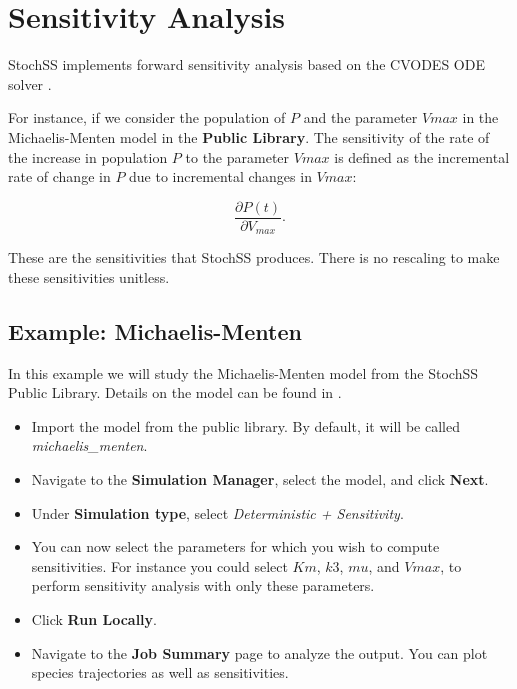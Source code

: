 \chapter{Sensitivity Analysis}

StochSS implements forward sensitivity analysis based on the CVODES ODE solver \cite{sundials}.

For instance, if we consider the population of $P$ and the parameter $Vmax$ in the Michaelis-Menten model in the \textbf{Public Library}. The sensitivity of the rate of the increase in population $P$ to the parameter $Vmax$ is defined as the incremental rate of change in $P$ due to incremental changes in $Vmax$:

\begin{equation}
\frac{\partial P(t)}{\partial V_{max}}.
\end{equation}

These are the sensitivities that StochSS produces. There is no rescaling to make these sensitivities unitless.

\section{Example: Michaelis-Menten}

In this example we will study the Michaelis-Menten model from the StochSS Public Library. Details on the model can be found in \cite{wiki-michaelis-menten}.
\begin{itemize}
\item Import the model from the public library. By default, it will be called \textit{michaelis\_menten}.
\item Navigate to the \textbf{Simulation Manager}, select the model, and click \textbf{Next}.
\item Under \textbf{Simulation type}, select \textit{Deterministic + Sensitivity}.
\item You can now select the parameters for which you wish to compute sensitivities. For instance you could select $Km$, $k3$, $mu$, and $Vmax$, to perform sensitivity analysis with only these parameters.
\item Click \textbf{Run Locally}. 
\item Navigate to the \textbf{Job Summary} page to analyze the output. You can plot species trajectories as well as sensitivities.
\end{itemize}


